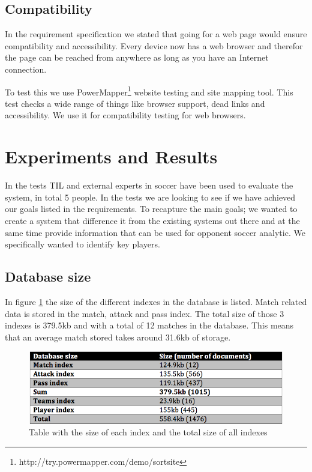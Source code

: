 \subsection{Compatibility}

In the requirement specification we stated that going for a web page would ensure compatibility and accessibility. Every device now has a web browser and therefor the page can be reached from anywhere as long as you have an Internet connection. 

To test this we use PowerMapper\footnote{ http://try.powermapper.com/demo/sortsite } website testing and site mapping tool. This test checks a wide range of things like browser support, dead links and accessibility. We use it for compatibility testing for web browsers.

\section{Experiments and Results}

In the tests \ac{TIL} and external experts in soccer have been used to evaluate the system, in total 5 people. In the tests we are looking to see if we have achieved our goals listed in the requirements. To recapture the main goals; we wanted to create a system that difference it from the existing systems out there and at the same time provide information that can be used for opponent soccer analytic. We specifically wanted to identify key players.

\subsection{Database size}
In figure \ref{fig:dbsize} the size of the different indexes in the database is listed. Match related data is stored in the match, attack and pass index. The total size of those 3 indexes is 379.5kb and with a total of 12 matches in the database. This means that an average match stored takes around 31.6kb of storage.

\begin{figure}[ht!]
\centering
\includegraphics[width=1\textwidth]{images/evaluation/dbsize}
\caption{Table with the size of each index and the total size of all indexes}
\label{fig:dbsize}
\end{figure}


